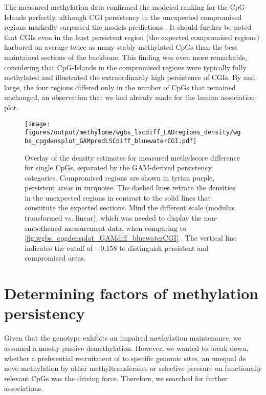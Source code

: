 The measured methylation data confirmed the modeled ranking for the CpG-Islands perfectly, although CGI persistency in the unexpected compromised regions markedly surpassed the models predictions 	. It should further be noted that CGIs even in the least persistent region (the expected compromised regions) harbored on average twice as many stably methylated CpGs than the best maintained sections of the backbone. This finding was even more remarkable, considering that CpG-Islands in the compromised regions were typically fully methylated and illustrated the extraordinarily high persistence of CGIs. By and large, the four regions differed only in the number of CpGs that remained unchanged, an observation that we had already made for the lamina association plot.

\begin{figure}[!ht]
	\centering
	\texttt{[image: figures/output/methylome/wgbs\_lscdiff\_LADregions\_density/wgbs\_cpgdensplot\_GAMpredLSCdiff\_bluewaterCGI.pdf]} 
	\caption{Overlay of the density estimates for measured methylscore difference for single CpGs, separated by the GAM-derived persistency categories. Compromised regions are shown in tyrian purple, persistent areas in turquoise. The dashed lines retrace the densities in the unexpected regions in contrast to the solid lines that constitute the expected sections. Mind the different scale (modulus transformed vs. linear), which was needed to display the non-smoothened measurement data, when comparing to \autoref{fig:wgbs_cpgdensplot_GAMdiff_bluewaterCGI} . The vertical line indicates the cutoff of \num{-0.158} to distinguish persistent and compromised areas.}
	\label{fig:wgbs_cpgdensplot_GAMpredLSCdiff_bluewaterCGI.pdf}
\end{figure}

\section{Determining factors of methylation persistency} 
\label{chap:r:persistency}

Given that the \dnmtchip genotype exhibits an impaired methylation maintenance, we assumed a mostly passive demethylation. However, we wanted to break down, whether a preferential recruitment of  to specific genomic sites, an unequal de novo methylation by other methyltransferases or selective pressure on functionally relevant CpGs was the driving force. Therefore, we searched for further associations. 
 
